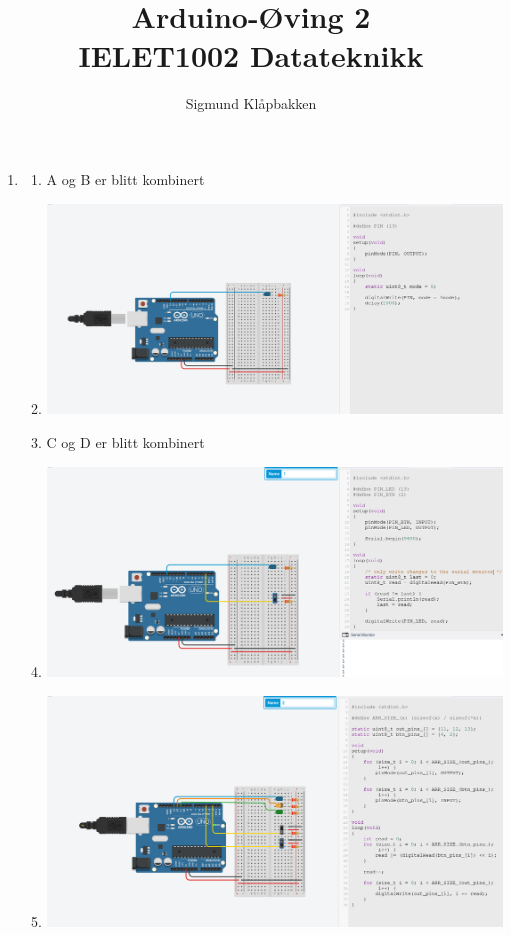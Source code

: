 \documentclass[a4paper,12pt]{article}
\title{Arduino-Øving 2\\ \large{IELET1002 Datateknikk}}
\author{Sigmund Klåpbakken}
\begin{document}
\maketitle
\begin{enumerate}
    \item {
    \begin{enumerate}[label=\alph*)]
        \item {A og B er blitt kombinert}
        \item {\includegraphics[width=\textwidth]{flash}}
        \item {C og D er blitt kombinert}
        \item {\includegraphics[width=\textwidth]{digitalswitch}}
        \item {\includegraphics[width=\textwidth]{digitalbin}}

\end{enumerate}}
\end{enumerate}
\end{document}

